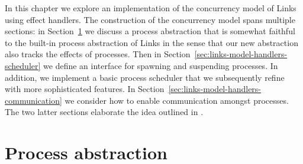 \documentclass[12pt,mscres,cdtppar,twoside,openright,logo,rightchapter,normalheadings]{infthesis}
\theoremstyle{definition}
\begin{document}
%

In this chapter we explore an implementation of the concurrency model
of Links using effect handlers. The construction of the concurrency
model spans multiple sections: in
Section~\ref{sec:links-model-handlers-process} we discuss a process
abstraction that is somewhat faithful to the built-in process
abstraction of Links in the sense that our new abstraction also tracks
the effects of processes. Then in
Section~\ref{sec:links-model-handlers-scheduler} we define an
interface for spawning and suspending processes. In addition, we
implement a basic process scheduler that we subsequently refine with
more sophisticated features. In
Section~\ref{sec:links-model-handlers-communication} we consider how
to enable communication amongst processes. The two latter sections
elaborate the idea outlined in \cite{Hillerstrom2016c}.

\section{Process abstraction}
\label{sec:links-model-handlers-process}
\end{document}
